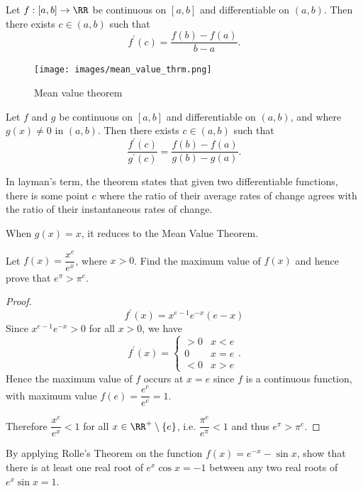 \begin{theorem}
Let $f:[a,b]\to\RR$ be continuous on $[a,b]$ and differentiable on $(a,b)$. Then there exists $c\in(a,b)$ such that 
\[ f^\prime(c)=\frac{f(b)-f(a)}{b-a}. \]
\end{theorem}

\begin{figure}[H]
    \centering
    \texttt{[image: images/mean\_value\_thrm.png]}
    \caption{Mean value theorem}
\end{figure}

\begin{theorem}
Let $f$ and $g$ be continuous on $[a,b]$ and differentiable on $(a,b)$, and where $g(x)\neq0$ in $(a,b)$. Then there exists $c\in(a,b)$ such that
\[ \frac{f^\prime(c)}{g^\prime(c)}=\frac{f(b)-f(a)}{g(b)-g(a)}. \]
\end{theorem}

In layman's term, the theorem states that given two differentiable functions, there is some point $c$ where the ratio of their average rates of change agrees with the ratio of their instantaneous rates of change.

\begin{remark}
When $g(x)=x$, it reduces to the Mean Value Theorem.
\end{remark}

\begin{exercise}
Let $f(x)=\dfrac{x^e}{e^x}$, where $x>0$. Find the maximum value of $f(x)$ and hence prove that $e^\pi>\pi^e$.
\end{exercise}

\begin{proof}
\[ f^\prime(x)=x^{e-1}e^{-x}(e-x) \]
Since $x^{e-1}e^{-x}>0$ for all $x>0$, we have
\[ f^\prime(x)=\begin{cases}
>0 & x<e\\
0 & x=e\\
<0 & x>e
\end{cases}. \]
Hence the maximum value of $f$ occurs at $x=e$ since $f$ is a continuous function, with maximum value $f(e)=\dfrac{e^e}{e^e}=1$.

Therefore $\dfrac{x^e}{e^x}<1$ for all $x\in\RR^+\setminus\{e\}$, i.e. $\dfrac{\pi^e}{e^\pi}<1$ and thus $e^\pi>\pi^e$.
\end{proof}

\begin{exercise}
By applying Rolle's Theorem on the function $f(x)=e^{-x}-\sin x$, show that there is at least one real root of $e^x\cos x=-1$ between any two real roots of $e^x\sin x=1$.
\end{exercise}

